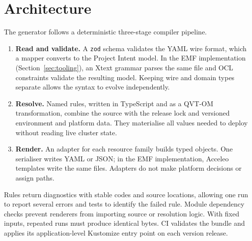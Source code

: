 \section{Architecture}
\label{sec:architecture}

The generator follows a deterministic three-stage compiler pipeline.

\begin{enumerate}
  \item \textbf{Read and validate.} A \texttt{zod} schema validates the YAML
    wire format, which a mapper converts to the Project Intent model. In the
    EMF implementation (Section~\ref{sec:tooling}), an Xtext grammar parses the same file and OCL
    constraints validate the resulting model. Keeping
    wire and domain types separate allows the syntax to evolve independently.
  \item \textbf{Resolve.} Named rules, written in TypeScript and as a QVT-OM
    transformation, combine the source with the release lock
    and versioned environment and platform data. They materialise all values
    needed to deploy without reading live cluster state.
  \item \textbf{Render.} An adapter for each resource family builds typed
    objects. One serialiser writes YAML or JSON; in the EMF implementation, Acceleo
    templates write the same files. Adapters do not make platform
    decisions or assign paths.
\end{enumerate}

Rules return diagnostics with stable codes and source locations, allowing one
run to report several errors and tests to identify the failed rule. Module
dependency checks prevent renderers from importing source or resolution logic.
With fixed inputs, repeated runs must produce identical bytes. CI validates the
bundle and applies its application-level Kustomize entry point on each version
release.

